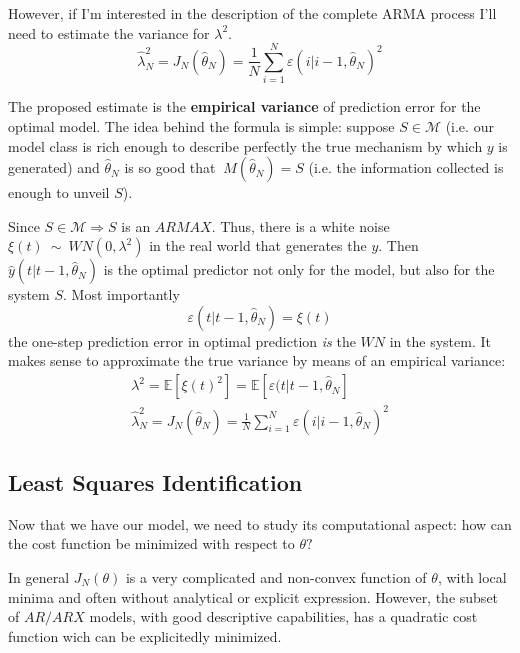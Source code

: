 However, if I'm interested in the description of the complete ARMA process I'll need to estimate the variance for $ \lambda ^{2}$. 
\begin{equation*}
\hat{\lambda }_{N}^{2} =J_{N}(\hat{\theta }_{N}) =\frac{1}{N}\sum _{i=1}^{N} \varepsilon ( i|i-1,\hat{\theta }_{N})^{2}
\end{equation*}

The proposed estimate is the \textbf{empirical variance} of prediction error for the optimal model. The idea behind the formula is simple: suppose $ S\in \mathcal{M} $ (i.e. our model class is rich enough to describe perfectly the true mechanism by which $ y$ is generated) and $ \hat{\theta }_{N}$ is so good that $ \ M(\hat{\theta }_{N}) =S$ (i.e. the information collected is enough to unveil $ S$).

Since $ S\in \mathcal{M} \Longrightarrow S$ is an $ ARMAX$. Thus, there is a white noise $ \xi ( t) \ \sim \ WN\left( 0,\lambda ^{2}\right)$ in the real world that generates the $ y$. Then $ \hat{y}( t|t-1,\hat{\theta }_{N})$ is the optimal predictor not only for the model, but also for the system $ S$. Most importantly
\begin{equation*}
\varepsilon ( t|t-1,\hat{\theta }_{N}) =\xi ( t)
\end{equation*}
the one-step prediction error in optimal prediction \textit{is} the $ WN$ in the system. It makes sense to approximate the true variance by means of an empirical variance:
\begin{gather*}
\lambda ^{2} =\mathbb{E}\left[ \xi ( t)^{2}\right] =\mathbb{E}[ \varepsilon ( t|t-1,\hat{\theta }_{N}]\\
\hat{\lambda }_{N}^{2} =J_{N}(\hat{\theta }_{N}) =\frac{1}{N}\sum _{i=1}^{N} \varepsilon ( i|i-1,\hat{\theta }_{N})^{2}
\end{gather*}

\subsection{Least Squares Identification}
Now that we have our model, we need to study its computational aspect: how can the cost function be minimized with respect to $ \theta ?$

In general $ J_{N}( \theta )$ is a very complicated and non-convex function of $ \theta $, with local minima and often without analytical or explicit expression. However, the subset of $ AR/ARX$ models, with good descriptive capabilities, has a quadratic cost function wich can be explicitedly minimized.

